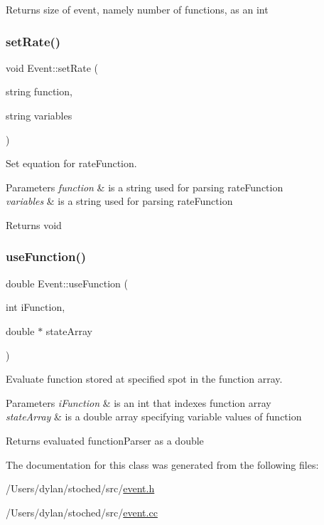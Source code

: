 \begin{DoxyReturn}{Returns}
size of event, namely number of functions, as an int 
\end{DoxyReturn}
\mbox{\label{class_event_a993a01984496bc158be92b67422f8655}} 
\subsubsection{\texorpdfstring{set\+Rate()}{setRate()}}
{\footnotesize\ttfamily void Event\+::set\+Rate (\begin{DoxyParamCaption}\item[{string}]{function,  }\item[{string}]{variables }\end{DoxyParamCaption})}



Set equation for rate\+Function. 


\begin{DoxyParams}{Parameters}
{\em function} & is a string used for parsing rate\+Function \\
\hline
{\em variables} & is a string used for parsing rate\+Function \\
\hline
\end{DoxyParams}
\begin{DoxyReturn}{Returns}
void 
\end{DoxyReturn}
\mbox{\label{class_event_a2637844b7f9583caf0f808c898dc2246}} 
\subsubsection{\texorpdfstring{use\+Function()}{useFunction()}}
{\footnotesize\ttfamily double Event\+::use\+Function (\begin{DoxyParamCaption}\item[{int}]{i\+Function,  }\item[{double $\ast$}]{state\+Array }\end{DoxyParamCaption})}



Evaluate function stored at specified spot in the function array. 


\begin{DoxyParams}{Parameters}
{\em i\+Function} & is an int that indexes function array \\
\hline
{\em state\+Array} & is a double array specifying variable values of function \\
\hline
\end{DoxyParams}
\begin{DoxyReturn}{Returns}
evaluated function\+Parser as a double 
\end{DoxyReturn}


The documentation for this class was generated from the following files\+:\begin{DoxyCompactItemize}
\item 
/\+Users/dylan/stoched/src/\hyperlink{event_8h}{event.\+h}\item 
/\+Users/dylan/stoched/src/\hyperlink{event_8cc}{event.\+cc}\end{DoxyCompactItemize}
